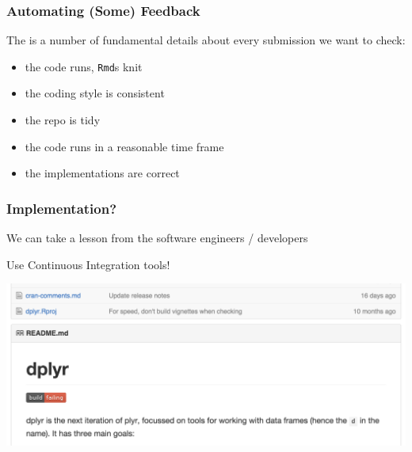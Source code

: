 \documentclass[12pt]{beamer}
\begin{document}
\begin{frame}
\frametitle{Automating (Some) Feedback}

The is a number of fundamental details about every submission we want to check:
\begin{itemize}
\item the code runs, \texttt{Rmd}s knit
\item the coding style is consistent
\item the repo is tidy
\item the code runs in a reasonable time frame
\item the implementations are correct
\end{itemize}

\end{frame}


\begin{frame}
\frametitle{Implementation?}

We can take a lesson from the software engineers / developers

\vspace{2mm} \pause

\begin{center}
{\large Use Continuous Integration tools!} 
\end{center}

\vspace{2mm}

\begin{center}
\includegraphics[width=\textwidth]{imgs/dplyr_CI.png}
\end{center}


\end{frame}
\end{document}
